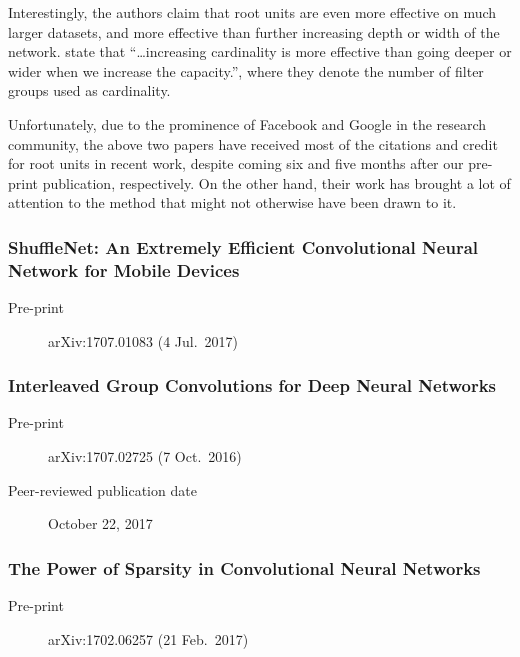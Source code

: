 \documentclass[thesis]{subfiles}
\begin{document}
Interestingly, the authors claim that root units are even more effective on much larger datasets, and more effective than further increasing depth or width of the network. \citet{saining2017} state that ``\ldots increasing cardinality is more effective than going deeper or wider when we increase the capacity.'', where they denote the number of filter groups used as cardinality.

Unfortunately, due to the prominence of Facebook and Google in the research community, the above two papers have received most of the citations and credit for root units in recent work, despite coming six and five months after our pre-print publication, respectively. On the other hand, their work has brought a lot of attention to the method that might not otherwise have been drawn to it.

\subsubsection*{ShuffleNet: An Extremely Efficient Convolutional
Neural Network for Mobile Devices}
\begin{description}
    \item[Pre-print] arXiv:1707.01083 (4 Jul.\ 2017)
\end{description}
\citet{zhang2017shufflenet}

\subsubsection*{Interleaved Group Convolutions for Deep Neural Networks}
\begin{description}
    \item[Pre-print] arXiv:1707.02725 (7 Oct.\ 2016)
    \item[Peer-reviewed publication date] October 22, 2017
\end{description}
\citet{zhang2017primal}

\subsubsection*{The Power of Sparsity in Convolutional Neural Networks}
\begin{description}
    \item[Pre-print] arXiv:1702.06257 (21 Feb.\ 2017)
\end{description}
\citet{changpinyo2017power}
\end{document}
